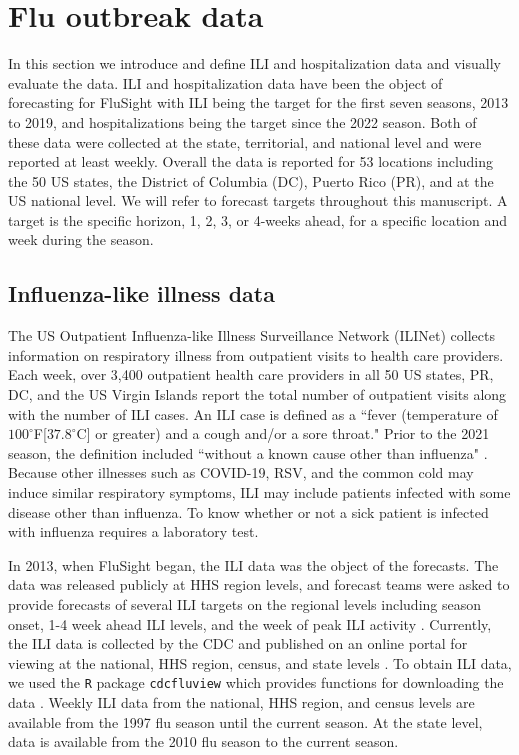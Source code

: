  \section{Flu outbreak data} \label{sec:data}
In this section we introduce and define ILI and hospitalization data and 
visually evaluate the data. ILI and hospitalization data have been the object 
of forecasting for FluSight with ILI being the target for the first seven
seasons, 2013 to 2019, and hospitalizations being the target since the 
2022 season. Both of 
these data were collected at the state, territorial, and national level and 
were reported at least weekly. Overall the data is reported for 53 locations 
including the 50 US states, the District of Columbia (DC), Puerto Rico (PR), 
and at the US national level. We will refer to forecast targets throughout this 
manuscript. A target is the specific horizon, 1, 2, 3, or 4-weeks ahead, for a 
specific location and week during the season.  

\subsection{Influenza-like illness data}
The US Outpatient Influenza-like Illness Surveillance Network (ILINet) collects 
information on respiratory illness from outpatient visits to health care 
providers. Each week, over 3,400 outpatient health care providers in all 50 
US states, PR, 
DC, and the US Virgin Islands report the total number of outpatient 
visits along with the number of ILI cases. An ILI case is defined as a 
``fever (temperature of $100^{\circ}$F[$37.8^{\circ}$C] or greater) and a cough 
and/or a sore throat." Prior to the 2021 season, the definition included 
``without a known cause other than influenza" \cite[]{cdcfluview2023}. Because 
other illnesses such as COVID-19, RSV, and the common cold may induce similar 
respiratory symptoms, ILI may include patients infected with some disease 
other than influenza. To know whether or not a sick patient is infected with 
influenza requires a laboratory test. 

In 2013, when FluSight began, the ILI data was the object of the forecasts. 
The data was released publicly at HHS region levels, and forecast teams were 
asked to provide forecasts of several ILI targets on the regional levels 
including season onset, 1-4 week ahead ILI levels, and the week of peak ILI 
activity \cite[]{biggerstaff2016results,mcgowan2019collaborative}. Currently, 
the ILI data is collected by the CDC and published on an online portal for 
viewing at the national, HHS region, census, and state levels 
\cite[]{cdc2024fluviewportal}. To obtain ILI data, we used the \texttt{R} 
package \texttt{cdcfluview} which provides functions for downloading the data 
\cite[]{rudis2021cdcfluview}. Weekly ILI data from the national, HHS region, 
and census levels are available from the 1997 flu season until the current 
season. At the state level, data is available from the 2010 flu season to the 
current season. 

